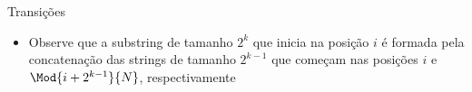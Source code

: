 \begin{frame}[fragile]{Transições}

    \begin{itemize}
        \item Observe que a substring de tamanho $2^k$ que inicia na posição $i$ é formada
            pela concatenação das strings de tamanho $2^{k - 1}$ que começam nas posições
            $i$ e $\Mod{i + 2^{k - 1}}{N}$, respectivamente
    \end{itemize}

\end{frame}
